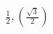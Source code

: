 \documentclass[preview]{standalone}
\begin{document}
\begin{align*}
\frac{1}{2}, \left(\frac{\sqrt{3}}{2}\right)
\end{align*}
\end{document}
